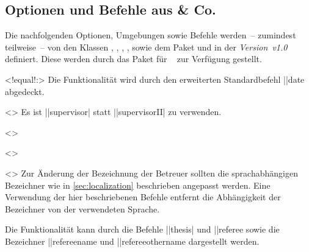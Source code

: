 \begin{DeclareEntity}{}
\subsection{Optionen und Befehle aus  \& Co.}
%
Die nachfolgenden Optionen, Umgebungen sowie Befehle werden~-- zumindest 
teilweise~-- von den Klassen , , 
, ,  sowie dem Paket 
 und \TUDScript in der \emph{Version~v1.0} definiert. Diese 
werden durch das Paket  für \TUDScript~\vTUDScript{} zur 
Verfügung gestellt.

\begin{Declaration}
  {}
  <!equal!:>
\printdeclarationlist
%
Die Funktionalität wird durch den erweiterten Standardbefehl \Macro||{date} 
abgedeckt.
\end{Declaration}

\begin{Declaration}
  {}
  <>
\printdeclarationlist
%
Es ist \Macro||{supervisor|}
statt \Macro||{supervisorII|} zu verwenden.
\end{Declaration}

\begin{Declaration}
  {}
  <>
\begin{Declaration}
  {}
  <>
\begin{Declaration}
  {}
  <>
\printdeclarationlist
%
Zur Änderung der Bezeichnung der Betreuer sollten die sprachabhängigen 
Bezeichner wie in \autoref{sec:localization} beschrieben angepasst werden. Eine 
Verwendung der hier beschriebenen Befehle entfernt die Abhängigkeit der 
Bezeichner von der verwendeten Sprache.
\end{Declaration}
\end{Declaration}
\end{Declaration}

\begin{Declaration}
  {}
\printdeclarationlist
%
Die Funktionalität kann durch die Befehle \Macro||{thesis|} und 
\Macro||{referee} sowie die Bezeichner \Term||{refereename} und 
\Term||{refereeothername} dargestellt werden.
\end{Declaration}


\end{DeclareEntity}
